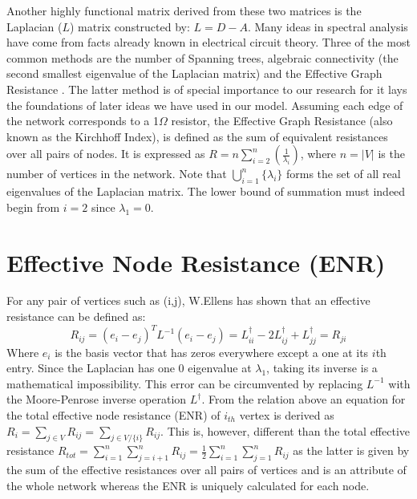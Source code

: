 \documentclass{article}
\begin{document}
	Another highly functional matrix derived from these two matrices is the Laplacian ($L$) matrix constructed by: $L=D-A$. Many ideas in spectral analysis have come from facts already known in electrical circuit theory. Three of the most common methods are the number of Spanning trees, algebraic connectivity (the second smallest eigenvalue of the Laplacian matrix) and the Effective Graph Resistance \cite{ellens2013graph}. The latter method is of special importance to our research for it lays the foundations of later ideas we have used in our model. 
	Assuming each edge of the network corresponds to a 1$\Omega$ resistor, the Effective Graph Resistance (also known as the Kirchhoff Index), is defined as the sum of equivalent resistances over all pairs of nodes. It is expressed as
	$R = n \sum_{i=2}^{n}(\frac{1}{\lambda_{i}})$, where $n = |V|$ is the number of vertices in the network\cite{klein1993m}\cite{yamashita2021effective}. Note that $\bigcup_{i=1}^{n} \{\lambda_i\}$ forms the set of all real eigenvalues of the Laplacian matrix. The lower bound of summation must indeed begin from $i=2$ since $\lambda_1 = 0$.
	
	\section{Effective Node Resistance (ENR)}
	For any pair of vertices such as (i,j), W.Ellens \cite{ellens2013graph} has shown that an effective resistance can be defined as:
	\begin{equation}
		R_{ij} = (e_i-e_j)^T  L^{-1} (e_i-e_j) = L_{ii}^{\dag} -2L_{ij}^{\dag} + L_{jj}^{\dag}= R_{ji}
	\end{equation}
	Where $e_i$ is the basis vector that has zeros everywhere except a one at its $i$th entry. Since the Laplacian has one 0 eigenvalue at $\lambda_1$, taking its inverse is a mathematical impossibility. This error can be circumvented by replacing $L^{-1}$ with the Moore-Penrose inverse operation $L^\dag$. From the relation above an equation for the total effective node resistance (ENR) of $i_{th}$ vertex is derived as $R_i = \sum_{j\in V}R_{ij} = \sum_{j\in V/ \{i\}} R_{ij}$. This is, however, different than the total effective resistance $R_{tot}= \sum_{i=1}^{n}\sum_{j=i+1}^{n}R_{ij} = \frac{1}{2}\sum_{i=1}^{n}\sum_{j=1}^{n}R_{ij}$ as the latter is given by the sum of the effective resistances over
	all pairs of vertices and is an attribute of the whole network whereas the ENR is uniquely calculated for each node.
	
\end{document}
